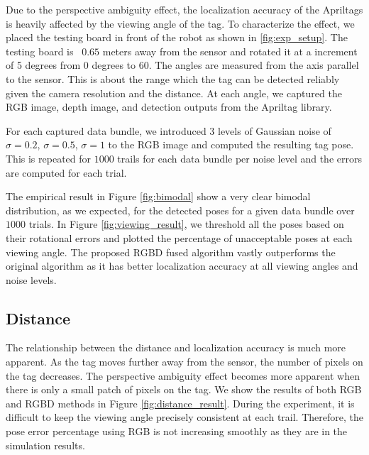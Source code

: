 Due to the perspective ambiguity effect, the localization accuracy of the Apriltags is heavily affected by the viewing angle of the tag. To characterize the effect, we placed the testing board in front of the robot as shown in \ref{fig:exp_setup}. The testing board is ~$0.65$ meters away from the sensor and rotated it at a increment of 5 degrees from 0 degrees to 60. The angles are measured from the axis parallel to the sensor. This is about the range which the tag can be detected reliably given the camera resolution and the distance. At each angle, we captured the RGB image, depth image, and detection outputs from the Apriltag library. 

For each captured data bundle, we introduced 3 levels of Gaussian noise of $\sigma = 0.2$, $\sigma = 0.5$, $\sigma = 1$  to the RGB image and computed the resulting tag pose. This is repeated for $1000$ trails for each data bundle per noise level and the errors are computed for each trial.  

The empirical result in Figure \ref{fig:bimodal} show a very clear bimodal distribution, as we expected, for the detected poses for a given data bundle over $1000$ trials. In Figure \ref{fig:viewing_result}, we threshold all the poses based on their rotational errors and plotted the percentage of unacceptable poses at each viewing angle. The proposed RGBD fused algorithm vastly outperforms the original algorithm as it has better localization accuracy at all viewing angles and noise levels. 

\subsection{Distance}

The relationship between the distance and localization accuracy is much more apparent. As the tag moves further away from the sensor, the number of pixels on the tag decreases. The perspective ambiguity effect becomes more apparent when there is only a small patch of pixels on the tag. We show the results of  both RGB and RGBD methods in Figure \ref{fig:distance_result}. During the experiment, it is difficult to keep the viewing angle precisely consistent at each trail. Therefore, the pose error percentage using RGB is not increasing smoothly as they are in the simulation results.

